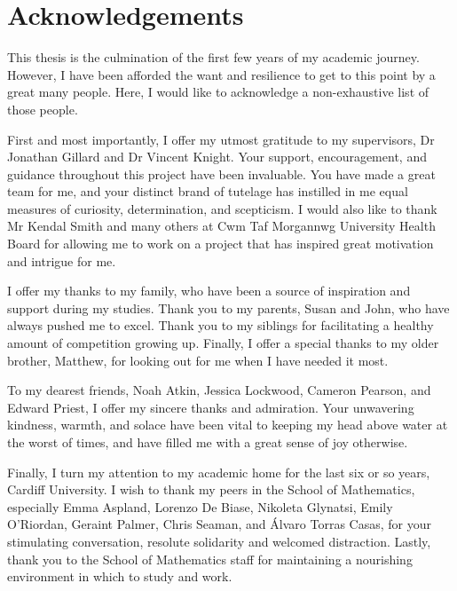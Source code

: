 \chapter*{Acknowledgements}

This thesis is the culmination of the first few years of my academic journey.
However, I have been afforded the want and resilience to get to this point by
a great many people. Here, I would like to acknowledge a non-exhaustive list of
those people.

First and most importantly, I offer my utmost gratitude to my supervisors, Dr
Jonathan Gillard and Dr Vincent Knight. Your support, encouragement, and
guidance throughout this project have been invaluable. You have made a great
team for me, and your distinct brand of tutelage has instilled in me equal
measures of curiosity, determination, and scepticism. I would also like to thank
Mr Kendal Smith and many others at Cwm Taf Morgannwg University Health Board for
allowing me to work on a project that has inspired great motivation and intrigue
for me.

I offer my thanks to my family, who have been a source of inspiration and
support during my studies. Thank you to my parents, Susan and John, who have
always pushed me to excel. Thank you to my siblings for facilitating a healthy
amount of competition growing up. Finally, I offer a special thanks to my older
brother, Matthew, for looking out for me when I have needed it most.

To my dearest friends, Noah Atkin, Jessica Lockwood, Cameron Pearson, and Edward
Priest, I offer my sincere thanks and admiration. Your unwavering kindness,
warmth, and solace have been vital to keeping my head above water at the worst
of times, and have filled me with a great sense of joy otherwise.

Finally, I turn my attention to my academic home for the last six or so years,
Cardiff University. I wish to thank my peers in the School of Mathematics,
especially Emma Aspland, Lorenzo De Biase, Nikoleta Glynatsi, Emily O'Riordan,
Geraint Palmer, Chris Seaman, and \'{A}lvaro Torras Casas, for your stimulating
conversation, resolute solidarity and welcomed distraction. Lastly, thank you to
the School of Mathematics staff for maintaining a nourishing environment in
which to study and work. 
